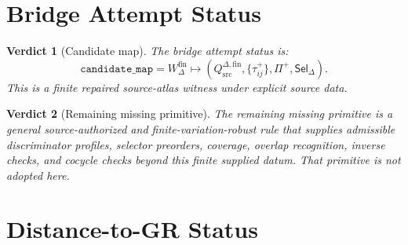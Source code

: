 \documentclass[11pt]{article}
\newcommand{\Prof}{\Pi^{+}}
\newcommand{\Sel}{\mathsf{Sel}_{\Delta}}
\newcommand{\Qdisc}{Q_{\mathrm{src}}^{\Delta,\mathrm{fin}}}
\newcommand{\Wfin}{W_{\Delta}^{\mathrm{fin}}}
\newtheorem{verdict}{Verdict}
\begin{document}
\section{Bridge Attempt Status}

\begin{verdict}[Candidate map]
The bridge attempt status is:
\[
\texttt{candidate\_map} =
\Wfin \mapsto (\Qdisc,\{\tau_{ij}^{+}\},\Prof,\Sel).
\]
This is a finite repaired source-atlas witness under explicit source data.
\end{verdict}

\begin{verdict}[Remaining missing primitive]
The remaining missing primitive is a general source-authorized and
finite-variation-robust rule that supplies admissible discriminator profiles,
selector preorders, coverage, overlap recognition, inverse checks, and cocycle
checks beyond this finite supplied datum. That primitive is not adopted here.
\end{verdict}

\section{Distance-to-GR Status}
\end{document}
